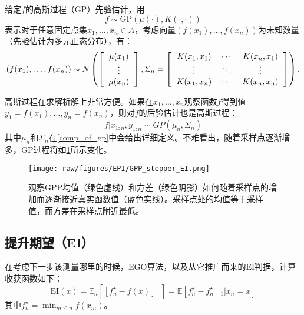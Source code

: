 \documentclass[index]{subfiles}
\begin{document}
给定$f$的高斯过程（GP）先验估计，用
\begin{equation}
 f \sim \mbox{GP}(\mu(\cdot), K(\cdot, \cdot))
\end{equation}
表示对于任意固定点集$x_{1}, \ldots, x_{n} \in A$，考虑向量$(f(x_{1}), \ldots, f(x_{n}))$为未知数量（先验估计为多元正态分布），有：
\begin{equation}
    (f(x_{1}), \ldots, f(x_{n})) \sim N\left( \left[ \begin{tabular}{c} $\mu(x_{1})$ \\ $\vdots$ \\ $\mu(x_{n})$ \end{tabular} \right] , \Sigma_{n} = \left[ \begin{tabular}{ccc} $K(x_{1}, x_{1})$ & $\cdots$ & $K(x_{n}, x_{1})$ \\ $\vdots$ & $\ddots$ & $\vdots$ \\ $K(x_{1}, x_{n})$ & $\cdots$ & $K(x_{n},x_{n})$ \end{tabular} \right] \right).
\end{equation}

高斯过程在求解析解上非常方便。如果在$x_{1}, \ldots, x_{n}$观察函数$f$得到值$y_{1} = f(x_{1}), \ldots, y_{n} = f(x_{n})$，则对$f$的后验估计也是高斯过程：
\begin{equation}
 f|x_{1:n}, y_{1:n} \sim GP(\mu_{n}, \Sigma_{n})
\end{equation}
其中$\mu_{n}$和$\Sigma_{n}$在\cref{comp_of_gp}中会给出详细定义。不难看出，随着采样点逐渐增多，GP过程将如\cref{fig:GPP_evolve}所示变化。

\begin{figure}[hpt]
 	\centerline{\texttt{[image: raw/figures/EPI/GPP\_stepper\_EI.png]}}
    \caption[GPP的演变]{观察GPP均值（绿色虚线）和方差（绿色阴影）如何随着采样点的增加而逐渐接近真实函数值（蓝色实线）。采样点处的均值等于采样值，而方差在采样点附近最低。}
 	\label{fig:GPP_evolve}
\end{figure}

\subsection{提升期望（EI）}

在考虑下一步该测量哪里的时候，EGO算法，以及从它推广而来的EI判据，计算收获函数如下：
\begin{equation}
 \mbox{EI}(x) = \mathbb{E}_{n} \left[\left[ f_{n}^{\star} - f(x) \right]^{+} \right] = \mathbb{E} \left[ f_{n}^{\star} - f_{n+1}^{\star}| x_{n} = x\right]
\end{equation}
其中$f_{n}^{\star} = \min_{m \leq n} f(x_{m})$。
\end{document}

